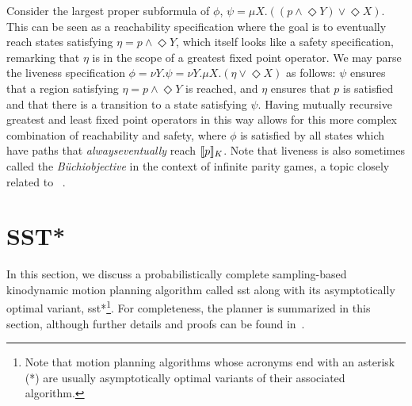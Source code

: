 \begin{enumerate}[label = (\roman*)]
    Consider the largest proper subformula of $\phi$, $\psi = {\mu X.((p \land \Diamond Y) \lor \Diamond X)}$. This can be seen as a reachability specification where the goal is to eventually reach states satisfying $\eta = p \land \Diamond Y$, which itself looks like a safety specification, remarking that $\eta$ is in the scope of a greatest fixed point operator. We may parse the liveness specification $\phi = {\nu Y.\psi} = {\nu Y.\mu X.(\eta \lor \Diamond X)}$ as follows: $\psi$ ensures that a region satisfying ${\eta = p \land \Diamond Y}$ is reached, and $\eta$ ensures that $p$ is satisfied and that there is a transition to a state satisfying $\psi$. Having mutually recursive greatest and least fixed point operators in this way allows for this more complex combination of reachability and safety, where $\phi$ is satisfied by all states which have paths that {\it always\/eventually} reach ${\llbracket}{} p {\rrbracket}{}_K$. Note that liveness is also sometimes called the {\it B\"uchi\/objective} in the context of infinite parity games, a topic closely related to \mucalc{}~\cite{Emerson1991,Karaman2012,Wilke2001}.
\end{enumerate}



\section{SST*}\label{prelims:sst}

In this section, we discuss a probabilistically complete sampling-based kinodynamic motion planning algorithm called \gls{sst} along with its asymptotically optimal variant, \gls{sst}*\footnote{Note that motion planning algorithms whose acronyms end with an asterisk (*) are usually asymptotically optimal variants of their associated algorithm.}. For completeness, the planner is summarized in this section, although further details and proofs can be found in~\cite{Li2016}.

